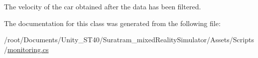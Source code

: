 The velocity of the car obtained after the data has been filtered.



The documentation for this class was generated from the following file\+:\begin{DoxyCompactItemize}
\item 
/root/\+Documents/\+Unity\+\_\+\+S\+T40/\+Suratram\+\_\+mixed\+Reality\+Simulator/\+Assets/\+Scripts/\hyperlink{monitoring_8cs}{monitoring.\+cs}\end{DoxyCompactItemize}
